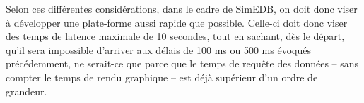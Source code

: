 %

Selon ces différentes considérations, dans le cadre de SimEDB, on doit donc viser à développer une plate-forme aussi rapide que possible.
Celle-ci doit donc viser des temps de latence maximale de 10 secondes, tout en sachant, dès le départ, qu'il sera impossible d'arriver aux délais de 100 ms ou 500 ms évoqués précédemment, ne serait-ce que parce que le temps de requête des données -- sans compter le temps de rendu graphique -- est déjà supérieur d'un ordre de grandeur.

